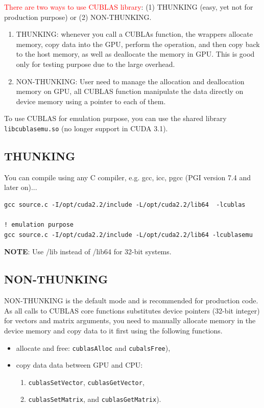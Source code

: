 \textcolor{red}{There are two ways to use CUBLAS library}: (1) THUNKING
  (easy, yet not for production purpose) or (2)
  NON-THUNKING. %
\begin{enumerate}
\item THUNKING: whenever you call a CUBLAs function, the wrappers
  allocate memory, copy data into the GPU, perform the operation, and
  then copy back to the host memory, as well as deallocate the memory
  in GPU. This is good only for testing purpose due to the large
  overhead.
\item NON-THUNKING: User need to manage the allocation and deallocation
  memory on GPU, all CUBLAS function manipulate the data directly on
  device memory using a pointer to each of them.
\end{enumerate}
To use CUBLAS for emulation purpose, you can use the shared library
\verb!libcublasemu.so! (no longer support in CUDA 3.1). 

\subsection{THUNKING}
\label{sec:thunking-1}

You can compile using any C compiler, e.g. gcc, icc, pgcc (PGI version
7.4 and later on)...
\begin{lstlisting}
gcc source.c -I/opt/cuda2.2/include -L/opt/cuda2.2/lib64  -lcublas

! emulation purpose
gcc source.c -I/opt/cuda2.2/include -L/opt/cuda2.2/lib64 -lcublasemu
\end{lstlisting}

{\bf NOTE}: Use /lib instead of /lib64 for 32-bit systems.

\subsection{NON-THUNKING}
\label{sec:non-thunking-1}

NON-THUNKING is the default mode and is recommended for production
code. As all calls to CUBLAS core functions substitutes device
pointers (32-bit integer) for vectors and matrix arguments, you
need to manually allocate memory in the device memory and copy data to
it first using the following functions.
\begin{itemize}
\item allocate and free: \verb!cublasAlloc! and \verb!cubalsFree!), 
\item copy data data between GPU and CPU:
  \begin{enumerate}
  \item \verb!cublasSetVector!, \verb!cublasGetVector!,
  \item \verb!cublasSetMatrix!, and \verb!cublasGetMatrix!).
  \end{enumerate}
\end{itemize}


